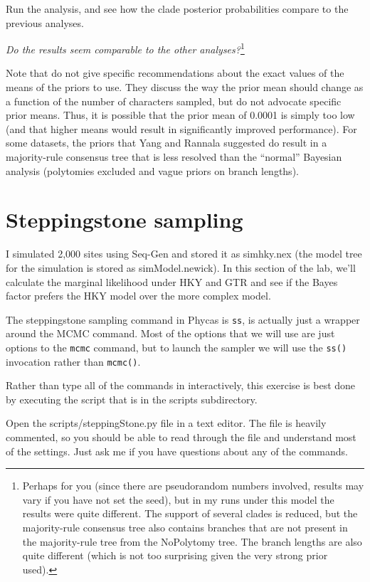 \documentclass{article}
\newcommand{\cmd}[1]{\texttt{#1}\xspace}
\newcommand{\localfile}[1]{\textsf{#1}\xspace}
\newcommand{\QandA}[2]{\textit{#1}\footnote{#2}\xspace}
\begin{document}
Run the analysis, and see how the clade posterior probabilities compare to the previous analyses.

\QandA{Do the results seem comparable to the other analyses?}{Perhaps for you (since there are pseudorandom numbers involved, results may vary if you have not set the seed), but in my runs under this model the results were quite different.
The support of several clades is reduced, but the majority-rule consensus tree also contains 
branches that are not present in the majority-rule tree from the NoPolytomy tree.
The branch lengths are also quite different (which is not too surprising given the very strong prior 
used).}

Note that \citet{YangR2005} do not give specific recommendations about the exact values of the means of  the priors to use.
They discuss the way the prior mean should change as a function of the number of characters sampled, but
do not advocate specific prior means.
Thus, it is possible that the prior mean of 0.0001 is simply too low (and that higher means would result in significantly improved performance).
For some datasets, the priors that Yang and Rannala suggested do result in a majority-rule consensus tree that is less resolved than the ``normal'' Bayesian analysis (polytomies excluded and vague priors on 
branch lengths).

\section{Steppingstone sampling}
I simulated 2,000 sites using Seq-Gen and stored it as \localfile{simhky.nex} (the model tree for the simulation is stored as \localfile{simModel.newick}).
In this section of the lab, we'll calculate the marginal likelihood under HKY and GTR and see if the Bayes factor prefers the HKY model over the more complex model.

The steppingstone sampling command in Phycas is \cmd{ss}, is actually just a wrapper around the MCMC command. 
Most of the options that we will use are just options to the \cmd{mcmc} command, but to launch the sampler we will use the \cmd{ss()} invocation rather than \cmd{mcmc()}.

Rather than type all of the commands in interactively, this exercise is best done by executing the script that is in the scripts subdirectory.

Open the \localfile{scripts/steppingStone.py} file in a text editor.
The file is heavily commented, so you should be able to read through the file and understand most of the settings. 
Just ask me if you have questions about any of the commands.
\end{document}
